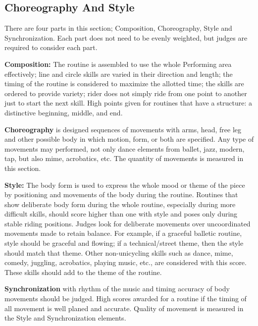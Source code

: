 \subsection{Choreography And Style \label{subsec:freestyle_individual-presentation-score_choreography-style}}
There are four parts in this section; Composition, Choreography, Style and Synchronization.
Each part does not need to be evenly weighted, but judges are required to consider each part.

\textbf{Composition:} The routine is assembled to use the whole Performing area effectively; line and circle skills are varied in their direction and length; the timing of the routine is considered to maximize the allotted time; the skills are ordered to provide variety; rider does not simply ride from one point to another just to start the next skill.
High points given for routines that have a structure: a distinctive beginning, middle, and end.

\textbf{Choreography} is designed sequences of movements with arms, head, free leg and other possible body in which motion, form, or both are specified.
Any type of movements may performed, not only dance elements from ballet, jazz, modern, tap, but also mime, acrobatics, etc.
The quantity of movements is measured in this section.

\textbf{Style:} The body form is used to express the whole mood or theme of the piece by positioning and movements of the body during the routine.
Routines that show deliberate body form during the whole routine, especially during more difficult skills, should score higher than one with style and poses only during stable riding positions.
Judges look for deliberate movements over uncoordinated movements made to retain balance.
For example, if a graceful balletic routine, style should be graceful and flowing; if a technical/street theme, then the style should match that theme.
Other non-unicycling skills such as dance, mime, comedy, juggling, acrobatics, playing music, etc., are considered with this score.
These skills should add to the theme of the routine.

\textbf{Synchronization} with rhythm of the music and timing accuracy of body movements should be judged.
High scores awarded for a routine if the timing of all movement is well planed and accurate.
Quality of movement is measured in the Style and Synchronization elements.


